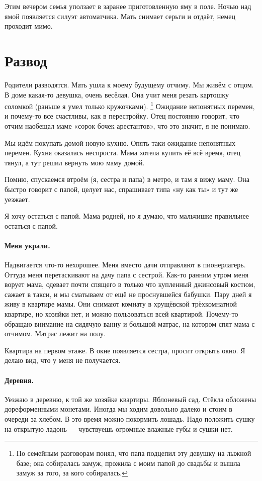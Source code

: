 \documentclass{book}
\begin{document}
Этим вечером семья уползает в заранее приготовленную яму в поле.
Ночью над ямой появляется силуэт автоматчика.
Мать снимает серьги и отдаёт, немец проходит мимо.

\section*{Развод}

Родители разводятся.
Мать ушла к моему будущему отчиму.
Мы живём с отцом.
В доме какая-то девушка, очень весёлая.
Она учит меня резать картошку соломкой (раньше я умел только кружочками).%
\footnote{По семейным разговорам понял, что папа подцепил эту девушку на лыжной базе;
она собиралась замуж, прожила с моим папой до свадьбы и вышла замуж за того, за кого собиралась.}
Ожидание непонятных перемен, и почему-то все счастливы, как в перестройку.
Отец постоянно говорит, что отчим наобещал маме «сорок бочек арестантов», что это значит, я не понимаю.

Мы идём покупать домой новую кухню.
Опять-таки ожидание непонятных перемен.
Кухня оказалась неспроста.
Мама хотела купить её всё время, отец тянул, а тут решил вернуть мою маму домой.

Помню, спускаемся втроём (я, сестра и папа) в метро, и там я вижу маму.
Она быстро говорит с папой, целует нас, спрашивает типа «ну как ты» и тут же уезжает.

Я хочу остаться с папой.
Мама родней, но я думаю, что мальчишке правильнее остаться с папой.

\paragraph{Меня украли.}
Надвигается что-то нехорошее.
Меня вместо дачи отправляют в пионерлагерь.
Оттуда меня перетаскивают на дачу папа с сестрой.
Как-то ранним утром меня ворует мама, одевает почти спящего в только что купленный джинсовый костюм, сажает в такси, и мы сматываем от ещё не проснувшейся бабушки.
Пару дней я живу в квартире мамы.
Они снимают комнату в хрущёвской трёхкомнатной квартире, но хозяйки нет, и можно пользоваться всей квартирой.
Почему-то обращаю внимание на сидячую ванну и большой матрас, на котором спят мама с отчимом.
Матрас лежит на полу.

Квартира на первом этаже.
В окне появляется сестра, просит открыть окно.
Я делаю вид, что у меня не получается.

\paragraph{Деревня.}
Уезжаю в деревню, к той же хозяйке квартиры.
Яблоневый сад.
Стёкла обложены дореформенными монетами.
Иногда мы ходим довольно далеко и стоим в очереди за хлебом.
В это время можно покормить лошадь.
Надо положить сушку на  открытую ладонь ---
чувствуешь огромные влажные губы и сушки нет.
\end{document}
